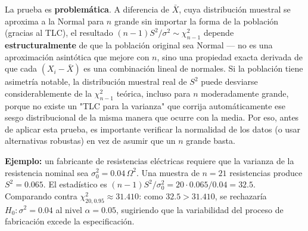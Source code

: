 \begin{solproblema}[prob:db05590]
	La prueba es \textbf{problemática}. A diferencia de $\bar X$, cuya distribución muestral se aproxima a la Normal para $n$ grande sin importar la forma de la población (gracias al TLC), el resultado $(n-1)S^2/\sigma^2 \sim \chi^2_{n-1}$ depende \textbf{estructuralmente} de que la población original sea Normal — no es una aproximación asintótica que mejore con $n$, sino una propiedad exacta derivada de que cada $(X_i-\bar X)$ es una combinación lineal de normales. Si la población tiene asimetría notable, la distribución muestral real de $S^2$ puede desviarse considerablemente de la $\chi^2_{n-1}$ teórica, incluso para $n$ moderadamente grande, porque no existe un "TLC para la varianza" que corrija automáticamente ese sesgo distribucional de la misma manera que ocurre con la media. Por eso, antes de aplicar esta prueba, es importante verificar la normalidad de los datos (o usar alternativas robustas) en vez de asumir que un $n$ grande basta.
\end{solproblema}

\begin{solproblema}[prob:501e850]
	\textbf{Ejemplo:} un fabricante de resistencias eléctricas requiere que la varianza de la resistencia nominal sea $\sigma_0^2=0.04\,\Omega^2$. Una muestra de $n=21$ resistencias produce $S^2=0.065$. El estadístico es $(n-1)S^2/\sigma_0^2 = 20\cdot0.065/0.04 = 32.5$. Comparando contra $\chi^2_{20,0.95}\approx31.410$: como $32.5 > 31.410$, se rechazaría $H_0:\sigma^2=0.04$ al nivel $\alpha=0.05$, sugiriendo que la variabilidad del proceso de fabricación excede la especificación.
\end{solproblema}
